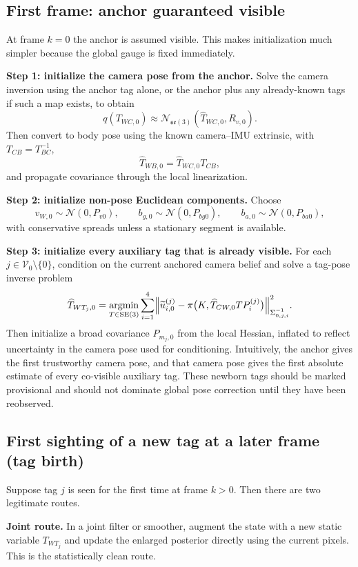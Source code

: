 \documentclass[11pt]{report}
\newcommand{\SE}{\mathrm{SE}(3)}
\newcommand{\seLie}{\mathfrak{se}(3)}
\newcommand{\argmin}{\operatorname*{argmin}}
\newcommand{\Normal}{\mathcal{N}}
\begin{document}
\subsection{First frame: anchor guaranteed visible}
At frame $k=0$ the anchor is assumed visible. This makes initialization much simpler because the global gauge is fixed immediately.

\textbf{Step 1: initialize the camera pose from the anchor.} Solve the camera inversion using the anchor tag alone, or the anchor plus any already-known tags if such a map exists, to obtain
\[
q(T_{WC,0})\approx \Normal_{\seLie}(\widehat T_{WC,0},R_{v,0}).
\]
Then convert to body pose using the known camera--IMU extrinsic, with $T_{CB}=T_{BC}^{-1}$,
\[
\widehat T_{WB,0}=\widehat T_{WC,0}T_{CB},
\]
and propagate covariance through the local linearization.

\textbf{Step 2: initialize non-pose Euclidean components.} Choose
\[
v_{W,0}\sim \Normal(0,P_{v0}),\qquad b_{g,0}\sim \Normal(0,P_{bg0}),\qquad b_{a,0}\sim \Normal(0,P_{ba0}),
\]
with conservative spreads unless a stationary segment is available.

\textbf{Step 3: initialize every auxiliary tag that is already visible.} For each $j\in\mathcal V_0\setminus\{0\}$, condition on the current anchored camera belief and solve a tag-pose inverse problem
\begin{equation}
\widehat T_{WT_j,0}
= \argmin_{T\in\SE}
\sum_{i=1}^{4}
\Bigl\|
\widetilde u_{i,0}^{(j)}-\pi\bigl(K,\widehat T_{CW,0}T P_i^{(j)}\bigr)
\Bigr\|^2_{\Sigma_{0,j,i}^{-1}}.
\label{eq:tag_birth_conditional_init}
\end{equation}
Then initialize a broad covariance $P_{m_j,0}$ from the local Hessian, inflated to reflect uncertainty in the camera pose used for conditioning. Intuitively, the anchor gives the first trustworthy camera pose, and that camera pose gives the first absolute estimate of every co-visible auxiliary tag. These newborn tags should be marked provisional and should not dominate global pose correction until they have been reobserved.

\subsection{First sighting of a new tag at a later frame (tag birth)}
Suppose tag $j$ is seen for the first time at frame $k>0$. Then there are two legitimate routes.

\textbf{Joint route.} In a joint filter or smoother, augment the state with a new static variable $T_{WT_j}$ and update the enlarged posterior directly using the current pixels. This is the statistically clean route.
\end{document}
